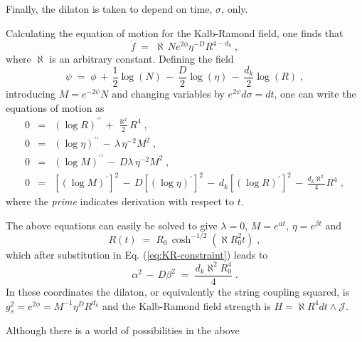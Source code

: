 \documentclass[a4paper,11pt]{article}
\begin{document}
Finally, the dilaton is taken to depend on time, $\sigma $, only.
\par
Calculating the equation of motion for the Kalb-Ramond field, one finds
that
\begin{equation}
  \dot{f} \;=\; \aleph\, Ne^{2\phi}\eta^{-D}R^{4-d_{k}} \; ,
\end{equation}
where $\aleph$ is an arbitrary constant.
Defining the field
\begin{equation}
\psi \;=\; \phi 
           \,+\, \textstyle{\frac{1}{2}}\log\left( N\right)
           \,-\, \textstyle{\frac{D}{2}}\log\left( \eta\right)
           \,-\, \textstyle{\frac{d_{k}}{2}}\log\left( R\right) \; ,
\end{equation}
introducing $M=e^{-2\psi}N$ and changing variables by $e^{2\psi}d\sigma =dt$,
one can write the equations of motion as
\begin{eqnarray}
0 &=&  \left(\log R\right)^{\prime\prime}
       \,+\, \textstyle{\frac{\aleph^{2}}{2}}R^{4} \label{eq:KR-R}\; ,\\
0 &=&  \left(\log \eta\right)^{\prime\prime}
       \,-\, \lambda\, \eta^{-2}M^{2} \; , \\
0 &=&  \left(\log M\right)^{\prime\prime}
       \,-\, D\lambda\, \eta^{-2}M^{2} \; ,  \\
0 &=& \left[ \left(\log M\right)^{\prime}\right]^{2}
      \,-\, D \left[ \left(\log \eta\right)^{\prime}\right]^{2}
      \,-\, d_{k}\left[ \left(\log R\right)^{\prime}\right]^{2}
      \,-\, \textstyle{\frac{d_{k}\aleph^{2}}{4}}R^{4} 
      \label{eq:KR-constraint}\; ,
\end{eqnarray}
where the {\em prime} indicates derivation with respect to $t$.
\par
The above equations can easily be solved to give $\lambda =0$,
$M=e^{\alpha t}$, $\eta =e^{\beta t}$ and 
\begin{equation}
 R(t)\;=\; R_{0}\, \cosh^{-1/2}\left( \aleph R_{0}^{2}t\right) \; ,
\end{equation}
which after substitution in Eq. (\ref{eq:KR-constraint}) leads 
to
\begin{equation}
\alpha^{2}\,-\, D\beta^{2} \;=\; \frac{d_{k}\aleph^{2}R_{0}^{4}}{4} \; .
\end{equation}
In these coordinates the dilaton, or equivalently the string coupling squared,
is $g_{s}^{2}= e^{2\phi}=M^{-1}\eta^{D}R^{d_{k}}$ and the Kalb-Ramond
field strength is $H=\aleph R^{4}dt\wedge \mathcal{J}$.
\par
Although there is a world of possibilities in the above
\end{document}
